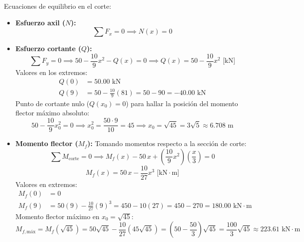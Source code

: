 Ecuaciones de equilibrio en el corte:
\begin{itemize}
    \item \textbf{Esfuerzo axil ($N$):}
          \begin{equation}
              \sum F_x = 0 \implies \boxed{N(x) = 0}
          \end{equation}

    \item \textbf{Esfuerzo cortante ($Q$):}
          \begin{equation}
              \sum F_y = 0 \implies 50 - \frac{10}{9}x^2 - Q(x) = 0 \implies \boxed{Q(x) = 50 - \frac{10}{9}x^2\text{ [kN]}}
          \end{equation}
          Valores en los extremos:
          \begin{align*}
              Q(0) & = 50.00\text{ kN}                                    \\
              Q(9) & = 50 - \frac{10}{9}(81) = 50 - 90 = -40.00\text{ kN}
          \end{align*}
          Punto de cortante nulo ($Q(x_0) = 0$) para hallar la posición del momento flector máximo absoluto:
          \begin{equation}
              50 - \frac{10}{9}x_0^2 = 0 \implies x_0^2 = \frac{50 \cdot 9}{10} = 45 \implies x_0 = \sqrt{45} = 3\sqrt{5} \approx \boxed{6.708\text{ m}}
          \end{equation}

    \item \textbf{Momento flector ($M_f$):}
          Tomando momentos respecto a la sección de corte:
          \begin{equation}
              \sum M_{\text{corte}} = 0 \implies M_f(x) - 50\,x + \left(\frac{10}{9}x^2\right)\left(\frac{x}{3}\right) = 0
          \end{equation}
          \begin{equation}
              \boxed{M_f(x) = 50\,x - \frac{10}{27}x^3\text{ [kN}\cdot\text{m]}}
          \end{equation}
          Valores en extremos:
          \begin{align*}
              M_f(0) & = 0                                                                                     \\
              M_f(9) & = 50(9) - \frac{10}{27}(9)^3 = 450 - 10(27) = 450 - 270 = 180.00\text{ kN}\cdot\text{m}
          \end{align*}
          Momento flector máximo en $x_0 = \sqrt{45}$:
          \begin{equation}
              M_{f,\text{máx}} = M_f(\sqrt{45}) = 50\sqrt{45} - \frac{10}{27}(45\sqrt{45}) = \left(50 - \frac{50}{3}\right)\sqrt{45} = \frac{100}{3}\sqrt{45} \approx \boxed{223.61\text{ kN}\cdot\text{m}}
          \end{equation}
\end{itemize}

